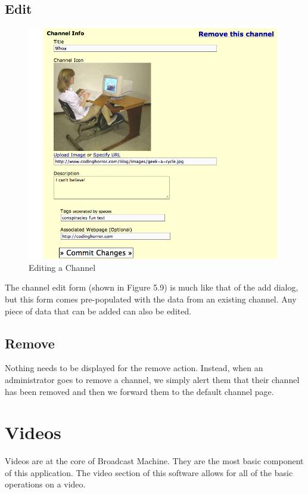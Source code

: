\documentclass[a4paper,12pt]{report}
\begin{document}
\subsection{Edit}
\begin{figure}[htp]
\begin{center}
\includegraphics[width=150mm]{./images/channeledit.png}
\end{center}
\caption{Editing a Channel}
\end{figure}

The channel edit form (shown in Figure 5.9) is much like that of the add dialog, but this form comes pre-populated with the data from an existing channel.
Any piece of data that can be added can also be edited.

\subsection{Remove}
Nothing needs to be displayed for the remove action.
Instead, when an administrator goes to remove a channel, we simply alert them that their channel has been removed and then we forward them to the default channel page.

\section{Videos}
Videos are at the core of Broadcast Machine.
They are the most basic component of this application.
The video section of this software allows for all of the basic operations on a video.
\end{document}
